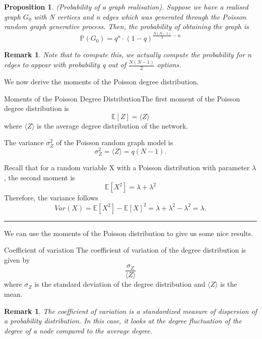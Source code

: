 \documentclass[twoside]{article}
\newcommand{\prob}{\mathbb{P}}
\newtheorem{proposition}[theorem]{Proposition}
\newtheorem{remark}[theorem]{Remark}
\newenvironment{proof}{{\bf Proof:}}{\hfill\rule{2mm}{2mm}}
\begin{document}
\begin{proposition}(Probability of a graph realisation). Suppose we have a realised graph $G_0$ with N vertices and n edges which was generated through the Poisson random graph generative process. Then, the probability of obtaining the graph is 
$$
\prob(G_0) = q^n \cdot (1 - q)^{\frac{N(N - 1)}{2} - n}
$$
\end{proposition}
\begin{remark} Note that to compute this, we actually compute the probability for n edges to appear with probability q out of $\frac{N(N - 1)}{2}$ options.
\end{remark}

We now derive the moments of the Poisson degree distribution.
\begin{proposition_exam}{Moments of the Poisson Degree Distribution}{}The first moment of the Poisson degree distribution is 
$$
\mathbb{E}[Z] = \langle Z \rangle
$$
where $\langle Z \rangle$ is the average degree distribution of the network. 

The variance $\sigma_{Z}^2$ of the Poisson random graph model is 
$$
\sigma_{Z}^2 = \langle Z \rangle = q(N - 1).
$$
\end{proposition_exam}

\begin{proof} Recall that for a random variable X with a Poisson distribution with parameter $\lambda$, the second moment is 
$$
\mathbb{E}[X^2] = \lambda + \lambda^2
$$
Therefore, the variance follows 
$$
Var(X) = \mathbb{E}[X^2] - \mathbb{E}[X]^2 = \lambda + \lambda^2 - \lambda^2 = \lambda.
$$
\end{proof}

We can use the moments of the Poisson distribution to give us some nice results.

\begin{definition_exam}{Coefficient of variation}{} The coefficient of variation of the degree distribution is given by 
$$
\frac{\sigma_Z}{\langle Z \rangle}
$$
where $\sigma_Z$ is the standard deviation of the degree distribution and $\langle Z \rangle$ is the mean.
\end{definition_exam}

\begin{remark} The coefficient of variation is a standardized measure of dispersion of a probability distribution. In this case, it looks at the degree fluctuation of the degree of a node compared to the average degree.
\end{remark}
\end{document}
